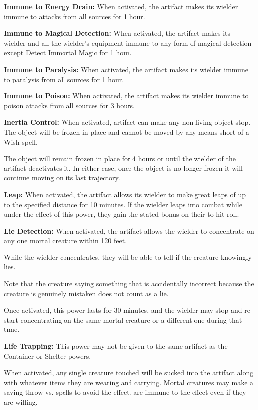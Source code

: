 \begin{multicols*}{2}
\textbf{Immune to Energy Drain:} When activated, the artifact makes its wielder immune to  attacks from all sources for 1 hour.

\textbf{Immune to Magical Detection:} When activated, the artifact makes its wielder and all the wielder’s equipment immune to any form of magical detection except Detect Immortal Magic for 1 hour.

\textbf{Immune to Paralysis:} When activated, the artifact makes its wielder immune to paralysis from all sources for 1 hour.

\textbf{Immune to Poison:} When activated, the artifact makes its wielder immune to poison attacks from all sources for 3 hours.

\textbf{Inertia Control:} When activated, artifact can make any non-living object stop. The object will be frozen in place and cannot be moved by any means short of a Wish spell.

The object will remain frozen in place for 4 hours or until the wielder of the artifact deactivates it. In either case, once the object is no longer frozen it will continue moving on its last trajectory.

\textbf{Leap:} When activated, the artifact allows its wielder to make great leaps of up to the specified distance for 10 minutes. If the wielder leaps into combat while under the effect of this power, they gain the stated bonus on their to-hit roll.

\textbf{Lie Detection:} When activated, the artifact allows the wielder to concentrate on any one mortal creature within 120 feet.

While the wielder concentrates, they will be able to tell if the creature knowingly lies.

Note that the creature saying something that is accidentally incorrect because the creature is genuinely mistaken does not count as a lie.

Once activated, this power lasts for 30 minutes, and the wielder may stop and re-start concentrating on the same mortal creature or a different one during that time.

\textbf{Life Trapping:} This power may not be given to the same artifact as the Container or Shelter powers.

When activated, any single creature touched will be sucked into the artifact along with whatever items they are wearing and carrying. Mortal creatures may make a saving throw vs. spells to avoid the effect.  are immune to the effect even if they are willing.


\end{multicols*}
